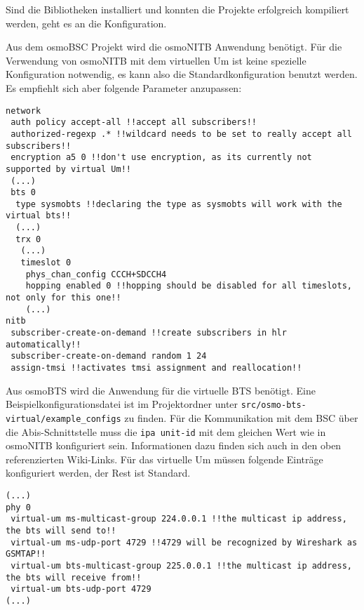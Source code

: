 Sind die Bibliotheken installiert und konnten die Projekte erfolgreich kompiliert werden, geht es an die Konfiguration. 

Aus dem osmoBSC Projekt wird die osmoNITB Anwendung benötigt. Für die Verwendung von osmoNITB mit dem virtuellen \ac{Um} ist keine spezielle Konfiguration notwendig, es kann also die Standardkonfiguration benutzt werden. Es empfiehlt sich aber folgende Parameter anzupassen:\\

\begin{lstlisting}[boxpos=c, frame=single, language=bytetxt, numbers=none, basicstyle=\tiny\ttfamily, tabsize=1 ]
network
 auth policy accept-all !!accept all subscribers!!
 authorized-regexp .* !!wildcard needs to be set to really accept all subscribers!!
 encryption a5 0 !!don't use encryption, as its currently not supported by virtual Um!!
 (...)
 bts 0
  type sysmobts !!declaring the type as sysmobts will work with the virtual bts!!
  (...)
  trx 0 
   (...)
   timeslot 0 
    phys_chan_config CCCH+SDCCH4 
    hopping enabled 0 !!hopping should be disabled for all timeslots, not only for this one!!
    (...)
nitb
 subscriber-create-on-demand !!create subscribers in hlr automatically!!
 subscriber-create-on-demand random 1 24
 assign-tmsi !!activates tmsi assignment and reallocation!!
\end{lstlisting}

Aus osmoBTS wird die Anwendung für die virtuelle \ac{BTS} benötigt. Eine Beispielkonfigurationsdatei ist im Projektordner unter \texttt{src/osmo-bts-virtual/example\_configs} zu finden. Für die Kommunikation mit dem \ac{BSC} über die Abis-Schnittstelle muss die \texttt{ipa unit-id} mit dem gleichen Wert wie in osmoNITB konfiguriert sein. Informationen dazu finden sich auch in den oben referenzierten Wiki-Links. Für das virtuelle \ac{Um} müssen folgende Einträge konfiguriert werden, der Rest ist Standard.\\

\begin{lstlisting}[boxpos=c, frame=single, language=bytetxt, numbers=none, basicstyle=\tiny\ttfamily, tabsize=1 ]
(...)
phy 0
 virtual-um ms-multicast-group 224.0.0.1 !!the multicast ip address, the bts will send to!!
 virtual-um ms-udp-port 4729 !!4729 will be recognized by Wireshark as GSMTAP!!
 virtual-um bts-multicast-group 225.0.0.1 !!the multicast ip address, the bts will receive from!!
 virtual-um bts-udp-port 4729
(...)
\end{lstlisting}

